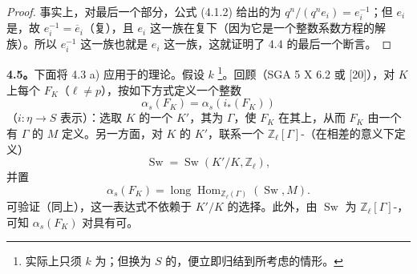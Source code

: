 \begin{proof}
事实上，对最后一个部分，公式 (4.1.2) 给出的为 $q^n/(q^ne_i)=e_i^{-1}$；但 $e_i$ 是，故 $e_i^{-1}=\overline e_i$（复），且 $e_i$ 这一族在复下（因为它是一个整数系数方程的解族）。所以 $e_i^{-1}$ 这一族也就是 $e_i$ 这一族，这就证明了 4.4 的最后一个断言。
\end{proof}
\textbf{4.5。}下面将 4.3 a) 应用于的理论。假设 $k$ \footnote{实际上只须 $k$ 为；但换为 $S$ 的，便立即归结到所考虑的情形。}。回顾（SGA 5 X 6.2 或 [20]），对 $K$ 上每个 $F_K$（$\ell\ne p$），按如下方式定义一个整数
\[
 \alpha_s(F_K)=\alpha_s(i_*(F_K)) \tag{4.5.1}
\]
（$i:\eta\to S$ 表示）：选取 $K$ 的一个 $K'$，其为 $\Gamma$，使 $F_K$ 在其上，从而 $F_K$ 由一个有 $\Gamma$ 的 $M$ 定义。另一方面，对 $K$ 的 $K'$，联系一个 $\mathbb Z_\ell[\Gamma]$-（在相差的意义下定义）
\[
 \operatorname{Sw}=\operatorname{Sw}(K'/K,\mathbb Z_\ell), \tag{4.5.2}
\]
并置
\[
 \alpha_s(F_K)=\operatorname{long}\operatorname{Hom}_{\mathbb Z_\ell(\Gamma)}
 (\operatorname{Sw},M). \tag{4.5.3}
\]
可验证（同上），这一表达式不依赖于 $K'/K$ 的选择。此外，由 $\operatorname{Sw}$ 为 $\mathbb Z_\ell[\Gamma]$-，
可知 $\alpha_s(F_K)$ 对具有可。

